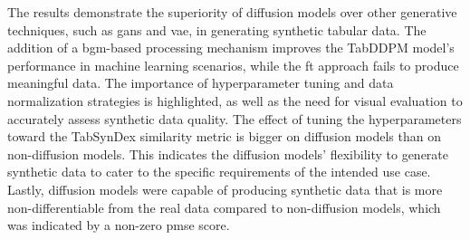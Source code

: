 The results demonstrate the superiority of diffusion models over other generative techniques, such as \Glspl{gan} and \gls{vae}, in generating synthetic tabular data.
The addition of a \gls{bgm}-based processing mechanism improves the TabDDPM model's performance in machine learning scenarios, while the \gls{ft} approach fails to produce meaningful data. 
The importance of hyperparameter tuning and data normalization strategies is highlighted, as well as the need for visual evaluation to accurately assess synthetic data quality. 
The effect of tuning the hyperparameters toward the TabSynDex similarity metric is bigger on diffusion models than on non-diffusion models.
This indicates the diffusion models' flexibility to generate synthetic data to cater to the specific requirements of the intended use case.
Lastly, diffusion models were capable of producing synthetic data that is more non-differentiable from the real data compared to non-diffusion models, which was indicated by a non-zero \gls{pmse} score. 

\cleardoublepage 
